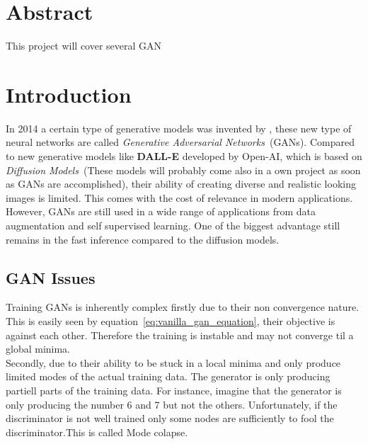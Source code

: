 \section{Abstract}
\label{sec:abstract}
This project will cover several GAN

\section{Introduction}
\label{sec:introduction}
In 2014 a certain type of generative models was invented by \textcite{goodfellow2014generative}, these new type of neural networks are called \textit{Generative Adversarial Networks}~(GANs). Compared to new generative models like \textbf{DALL-E} developed by Open-AI, which is based on \textit{Diffusion Models}~(These models will probably come also in a own project as soon as GANs are accomplished), their ability of creating diverse and realistic looking images is limited. This comes with the cost of relevance in modern applications. However, GANs are still used in a wide range of applications from data augmentation and self supervised learning. One of the biggest advantage still remains in the fast inference compared to the diffusion models. 


\subsection{GAN Issues}
\label{sec:gan_issues}
Training GANs is inherently complex firstly due to their non convergence nature. This is easily seen by equation~\ref{eq:vanilla_gan_equation}, their objective is against each other. Therefore the training is instable and may not converge til a global minima. \\
Secondly, due to their ability to be stuck in a local minima and only produce limited modes of the actual training data. The generator is only producing partiell parts of the training data. For instance, imagine that the generator is only producing the number 6 and 7 but not the others. Unfortunately, if the discriminator is not well trained only some nodes are sufficiently to fool the discriminator.This is called Mode colapse. \\
